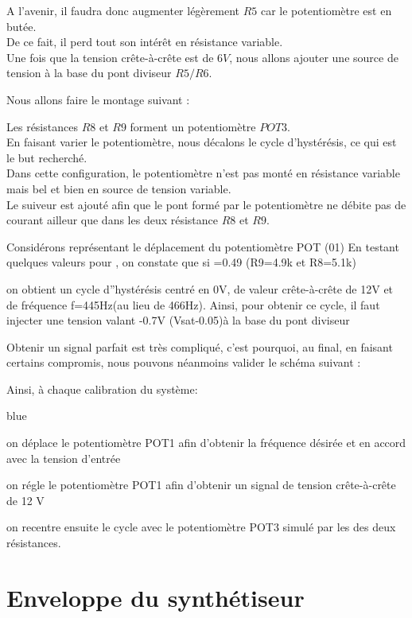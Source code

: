 {A l’avenir, il faudra donc augmenter légèrement $R5$ car le potentiomètre est en butée.\\
 De ce fait, il perd tout son intérêt en résistance variable.\\

Une fois que la tension crête-à-crête est de $6V$, nous allons ajouter une source de tension à la base du pont diviseur $R5/R6$.




Nous allons faire le montage suivant : 



Les résistances $R8$ et $R9$ forment un potentiomètre $POT3$. \\
En faisant varier le potentiomètre, nous décalons le cycle d'hystérésis, ce qui est le but recherché. \\

Dans cette configuration, le potentiomètre n’est pas monté en résistance variable mais bel et bien en source de tension variable.\\
Le suiveur est ajouté afin que le pont formé par le potentiomètre ne débite pas de courant ailleur que dans les deux résistance $R8$ et $R9$.

Considérons représentant le déplacement du potentiomètre POT (01)
En testant quelques valeurs pour , on constate que si =0.49 (R9=4.9k et R8=5.1k)


on obtient un cycle d”hystérésis centré en 0V, de valeur crête-à-crête de 12V et de fréquence f=445Hz(au lieu de 466Hz).
Ainsi, pour obtenir ce cycle, il faut injecter une tension valant -0.7V (Vsat-0.05)à la base du pont diviseur

Obtenir un signal parfait est très compliqué, c’est pourquoi, au final, en faisant certains compromis, nous pouvons néanmoins valider le schéma suivant :





Ainsi, à chaque calibration du système: 
\begin{items}{blue}{\Bullet}
\item on déplace le potentiomètre POT1 afin d’obtenir la fréquence désirée et en accord avec la tension d’entrée
\item on régle le potentiomètre POT1 afin d’obtenir un signal de tension crête-à-crête de 12 V
\item on recentre ensuite le cycle avec le potentiomètre POT3 simulé par les des deux résistances.
\end{items}\part{Enveloppe du synthétiseur}
}
